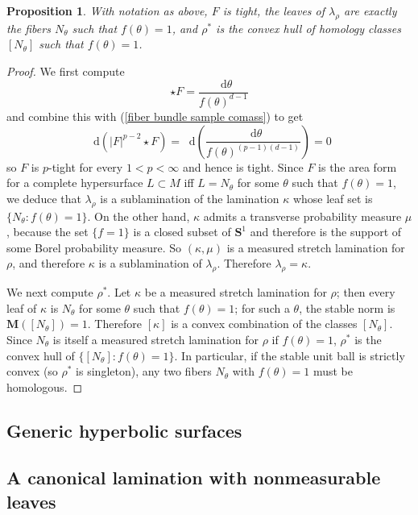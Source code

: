\documentclass[reqno,11pt]{amsart}
\newcommand{\Sph}{\mathbf S}
\newcommand*\dif{\mathop{}\!\mathrm{d}}
\newcommand{\Mass}{\mathbf M}
\newtheorem{proposition}[theorem]{Proposition}
\theoremstyle{definition}
\numberwithin{equation}{section}
\begin{document}
\begin{proposition}
With notation as above, $F$ is tight, the leaves of $\lambda_\rho$ are exactly the fibers $N_\theta$ such that $f(\theta) = 1$, and $\rho^*$ is the convex hull of homology classes $[N_\theta]$ such that $f(\theta) = 1$.
\end{proposition}
\begin{proof}
We first compute
$$\star F = \frac{\dif \theta}{f(\theta)^{d - 1}}$$
and combine this with (\ref{fiber bundle sample comass}) to get
$$\dif(|F|^{p - 2} \star F) = \dif\left(\frac{\dif \theta}{f(\theta)^{(p - 1)(d - 1)}}\right) = 0$$
so $F$ is $p$-tight for every $1 < p < \infty$ and hence is tight.
Since $F$ is the area form for a complete hypersurface $L \subset M$ iff $L = N_\theta$ for some $\theta$ such that $f(\theta) = 1$, we deduce that $\lambda_\rho$ is a sublamination of the lamination $\kappa$ whose leaf set is $\{N_\theta: f(\theta) = 1\}$.
On the other hand, $\kappa$ admits a transverse probability measure $\mu$, because the set $\{f = 1\}$ is a closed subset of $\Sph^1$ and therefore is the support of some Borel probability measure.
So $(\kappa, \mu)$ is a measured stretch lamination for $\rho$, and therefore $\kappa$ is a sublamination of $\lambda_\rho$.
Therefore $\lambda_\rho = \kappa$.

We next compute $\rho^*$.
Let $\kappa$ be a measured stretch lamination for $\rho$; then every leaf of $\kappa$ is $N_\theta$ for some $\theta$ such that $f(\theta) = 1$; for such a $\theta$, the stable norm is $\Mass([N_\theta]) = 1$.
Therefore $[\kappa]$ is a convex combination of the classes $[N_\theta]$.
Since $N_\theta$ is itself a measured stretch lamination for $\rho$ if $f(\theta) = 1$, $\rho^*$ is the convex hull of $\{[N_\theta]: f(\theta) = 1\}$.
In particular, if the stable unit ball is strictly convex (so $\rho^*$ is singleton), any two fibers $N_\theta$ with $f(\theta) = 1$ must be homologous.
\end{proof}

\subsection{Generic hyperbolic surfaces}

\subsection{A canonical lamination with nonmeasurable leaves}


\end{document}
